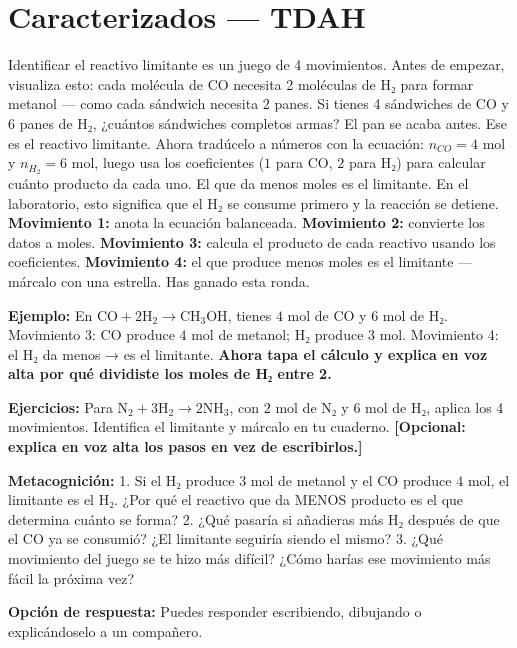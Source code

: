 \documentclass[
  spanish,
  letterpaper,
  12pt,
  oneside,
  open=any]{scrbook}
\newcommand{\setcolorsection}[2]{%
  \definecolor{currentsectionbg}{HTML}{#1}%
  \definecolor{currentsectionborder}{HTML}{#2}%
}
\begin{document}
\setcolorsection{d6c7e7}{c0b0d8}

\section{Caracterizados --- TDAH}\label{caracterizados-tdah}

Identificar el reactivo limitante es un juego de 4 movimientos. Antes de
empezar, visualiza esto: cada molécula de CO necesita 2 moléculas de H₂
para formar metanol --- como cada sándwich necesita 2 panes. Si tienes 4
sándwiches de CO y 6 panes de H₂, ¿cuántos sándwiches completos armas?
El pan se acaba antes. Ese es el reactivo limitante. Ahora tradúcelo a
números con la ecuación: \(n_{CO} = 4\) mol y \(n_{H_2} = 6\) mol, luego
usa los coeficientes (\(1\) para CO, \(2\) para H₂) para calcular cuánto
producto da cada uno. El que da menos moles es el limitante. En el
laboratorio, esto significa que el H₂ se consume primero y la reacción
se detiene. \textbf{Movimiento 1:} anota la ecuación balanceada.
\textbf{Movimiento 2:} convierte los datos a moles. \textbf{Movimiento
3:} calcula el producto de cada reactivo usando los coeficientes.
\textbf{Movimiento 4:} el que produce menos moles es el limitante ---
márcalo con una estrella. Has ganado esta ronda.

\textbf{Ejemplo:} En
\(\text{CO} + 2\text{H}_2 \rightarrow \text{CH}_3\text{OH}\), tienes
\(4\) mol de CO y \(6\) mol de H₂. Movimiento 3: CO produce \(4\) mol de
metanol; H₂ produce \(3\) mol. Movimiento 4: el H₂ da menos → es el
limitante. \textbf{Ahora tapa el cálculo y explica en voz alta por qué
dividiste los moles de H₂ entre 2.}

\textbf{Ejercicios:} Para
\(\text{N}_2 + 3\text{H}_2 \rightarrow 2\text{NH}_3\), con \(2\) mol de
N₂ y \(6\) mol de H₂, aplica los 4 movimientos. Identifica el limitante
y márcalo en tu cuaderno. \textbf{{[}Opcional: explica en voz alta los
pasos en vez de escribirlos.{]}}

\textbf{Metacognición:} 1. Si el H₂ produce \(3\) mol de metanol y el CO
produce \(4\) mol, el limitante es el H₂. ¿Por qué el reactivo que da
MENOS producto es el que determina cuánto se forma? 2. ¿Qué pasaría si
añadieras más H₂ después de que el CO ya se consumió? ¿El limitante
seguiría siendo el mismo? 3. ¿Qué movimiento del juego se te hizo más
difícil? ¿Cómo harías ese movimiento más fácil la próxima vez?

\textbf{Opción de respuesta:} Puedes responder escribiendo, dibujando o
explicándoselo a un compañero.
\end{document}
